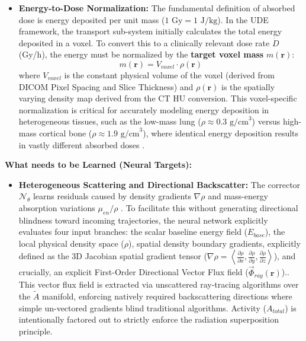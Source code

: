 \documentclass[11pt,a4paper]{article}
\begin{document}
\begin{itemize}
\begin{equation}
    \end{equation}
    This density map is essential for calculating the target mass $m(\mathbf{r})$ and serves as a primary spatial input for the neural corrector $\mathcal{N}_\theta$ \cite{GtzSchmidkonz2019, BaileyMarquis2022}.
    \item \textbf{Energy-to-Dose Normalization:} The fundamental definition of absorbed dose is energy deposited per unit mass ($1 \text{ Gy} = 1 \text{ J/kg}$). In the UDE framework, the transport sub-system initially calculates the total energy deposited in a voxel. To convert this to a clinically relevant dose rate $\dot{D}$ (Gy/h), the energy must be normalized by the \textbf{target voxel mass} $m(\mathbf{r})$:
    \begin{equation}
        m(\mathbf{r}) = V_{voxel} \cdot \rho(\mathbf{r})
    \end{equation}
    where $V_{voxel}$ is the constant physical volume of the voxel (derived from DICOM Pixel Spacing and Slice Thickness) and $\rho(\mathbf{r})$ is the spatially varying density map derived from the CT HU conversion. This voxel-specific normalization is critical for accurately modeling energy deposition in heterogeneous tissues, such as the low-mass lung ($ \rho \approx 0.3 \text{ g/cm}^3$) versus high-mass cortical bone ($\rho \approx 1.9 \text{ g/cm}^3$), where identical energy deposition results in vastly different absorbed doses \cite{GtzSchmidkonz2019, StabinMadsen2019}.
\end{itemize}

\textbf{What needs to be Learned (Neural Targets):}
\begin{itemize}
    \item \textbf{Heterogeneous Scattering and Directional Backscatter:} The corrector $\mathcal{N}_\theta$ learns residuals caused by density gradients $\nabla \rho$ and mass-energy absorption variations $\mu_{en}/\rho$ \cite{BaileyMarquis2022, MikellKappadath2016}. To facilitate this without generating directional blindness toward incoming trajectories, the neural network explicitly evaluates four input branches: the scalar baseline energy field ($E_{base}$), the local physical density space ($\rho$), spatial density boundary gradients, explicitly defined as the 3D Jacobian spatial gradient tensor ($\nabla\rho = \left\langle \frac{\partial \rho}{\partial x}, \frac{\partial \rho}{\partial y}, \frac{\partial \rho}{\partial z} \right\rangle$), and crucially, an explicit First-Order Directional Vector Flux field ($\vec{\Phi}_{ray}(\mathbf{r})$).. This vector flux field is extracted via unscattered ray-tracing algorithms over the $\tilde{A}$ manifold, enforcing natively required backscattering directions where simple un-vectored gradients blind traditional algorithms. Activity ($A_{total}$) is intentionally factored out to strictly enforce the radiation superposition principle.
\end{itemize}
\end{document}
